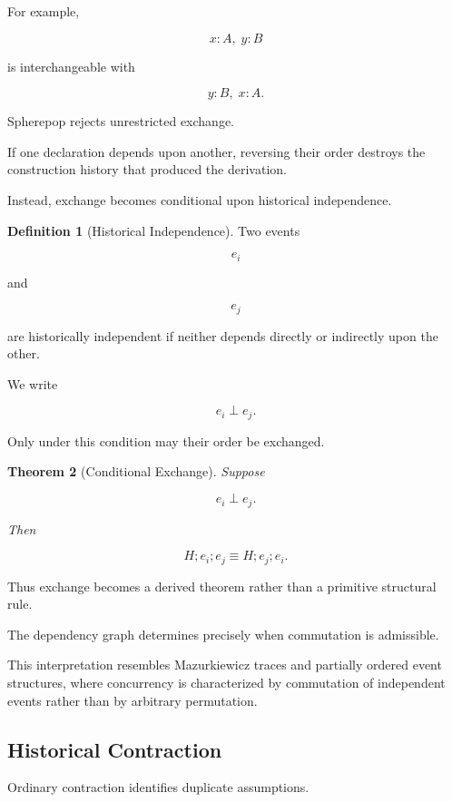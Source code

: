 \documentclass[12pt,oneside]{article}
\newtheorem{theorem}{Theorem}[section]
\theoremstyle{definition}
\newtheorem{definition}[theorem]{Definition}
\theoremstyle{remark}
\begin{document}
For example,

\[
x:A,
\;
y:B
\]

is interchangeable with

\[
y:B,
\;
x:A.
\]

Spherepop rejects unrestricted exchange.

If one declaration depends upon another, reversing their order destroys the
construction history that produced the derivation.

Instead, exchange becomes conditional upon historical independence.

\begin{definition}[Historical Independence]

Two events

\[
e_i
\]

and

\[
e_j
\]

are historically independent if neither depends directly or indirectly upon the
other.

We write

\[
e_i
\perp
e_j.
\]

\end{definition}

Only under this condition may their order be exchanged.

\begin{theorem}[Conditional Exchange]

Suppose

\[
e_i
\perp
e_j.
\]

Then

\[
H;
e_i;
e_j
\equiv
H;
e_j;
e_i.
\]

\end{theorem}

Thus exchange becomes a derived theorem rather than a primitive structural rule.

The dependency graph determines precisely when commutation is admissible.

This interpretation resembles Mazurkiewicz traces and partially ordered event
structures, where concurrency is characterized by commutation of independent
events rather than by arbitrary permutation.

\subsection{Historical Contraction}

Ordinary contraction identifies duplicate assumptions.
\end{document}
